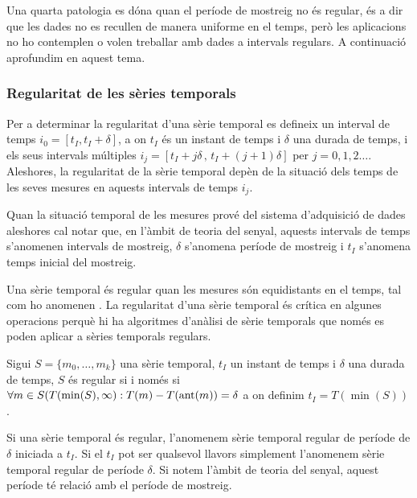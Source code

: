 Una quarta patologia es dóna quan el període de mostreig no és
regular, és a dir que les dades no es recullen de manera uniforme en
el temps, però les aplicacions no ho contemplen o volen treballar amb
dades a intervals regulars. A continuació aprofundim en aquest tema.






\subsubsection{Regularitat de les sèries temporals} 

Per a determinar la regularitat d'una sèrie temporal es defineix un
interval de temps $i_0=[t_I,t_I+\delta]$, a on $t_I$ és un instant de
temps i $\delta$ una durada de temps, i els seus intervals múltiples
$i_j=[t_I+j\delta\, ,\, t_I+(j+1)\delta]$ per
$j=0,1,2\ldots$. Aleshores, la regularitat de la sèrie temporal depèn
de la situació dels temps de les seves mesures en aquests intervals de
temps $i_j$.
 
Quan la situació temporal de les mesures prové del sistema
d'adquisició de dades aleshores cal notar que, en l'àmbit de
teoria del senyal, aquests intervals de temps s'anomenen intervals de
mostreig, $\delta$ s'anomena període de mostreig i $t_I$ s'anomena
temps inicial del mostreig.


Una sèrie temporal és regular quan les mesures són equidistants en el
temps, tal com ho anomenen \textcite{last:hetland}.  La regularitat
d'una sèrie temporal és crítica en algunes operacions perquè hi ha
algoritmes d'anàlisi de sèrie temporals que només es poden aplicar a
sèries temporals regulars.
\begin{definition}
  \label{def:st:regular}
  Sigui $S=\{m_0,\ldots,m_k\}$ una sèrie temporal, $t_I$ un instant de
  temps i $\delta$ una durada de temps, $S$ és regular si i
  només si $\forall m \in S(T(\min(S),\infty):T(m) - T(\operatorname*{ant}(m)) =
  \delta$ a on definim $t_I=T(\min(S))$.
\end{definition}

Si una sèrie temporal és regular, l'anomenem sèrie temporal regular de
període de $\delta$ iniciada a $t_I$. Si el $t_I$ pot ser qualsevol
llavors simplement l'anomenem sèrie temporal regular de període
$\delta$.  Si notem l'àmbit de teoria del senyal, aquest període té
relació amb el període de mostreig.



